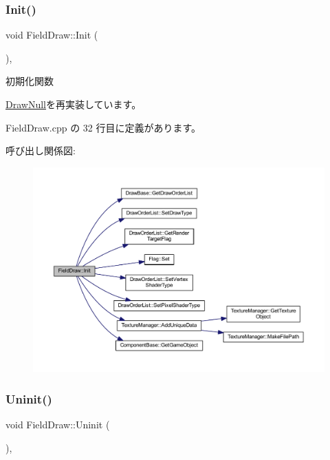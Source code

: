 \subsubsection{\texorpdfstring{Init()}{Init()}}
{\footnotesize\ttfamily void Field\+Draw\+::\+Init (\begin{DoxyParamCaption}{ }\end{DoxyParamCaption})\hspace{0.3cm}{\ttfamily [override]}, {\ttfamily [virtual]}}



初期化関数 



\mbox{\hyperlink{class_draw_null_acd7fef3ccea1da537ac9507ffbb6dd2e}{Draw\+Null}}を再実装しています。



 Field\+Draw.\+cpp の 32 行目に定義があります。

呼び出し関係図\+:\nopagebreak
\begin{figure}[H]
\begin{center}
\leavevmode
\includegraphics[width=350pt]{class_field_draw_a4287d2ce33033b2413c1d3a81b173373_cgraph}
\end{center}
\end{figure}
\mbox{\label{class_field_draw_a89a78212c141714d9e39e25e663aaeff}} 
\subsubsection{\texorpdfstring{Uninit()}{Uninit()}}
{\footnotesize\ttfamily void Field\+Draw\+::\+Uninit (\begin{DoxyParamCaption}{ }\end{DoxyParamCaption})\hspace{0.3cm}{\ttfamily [override]}, {\ttfamily [virtual]}}



